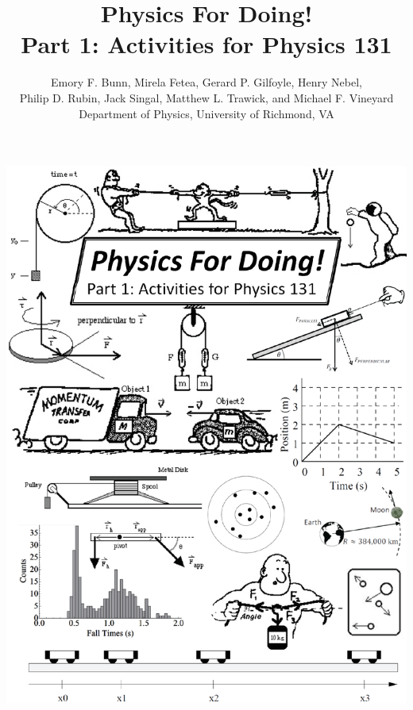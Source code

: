 \thispagestyle{empty}

\begin{center}
\includegraphics[width=7.3in,trim={0 0 .1cm 0},clip]{131_front_pages/131_front_cover.eps}
\end{center}
\newpage

\restoregeometry
\restorepagecolor

\title{Physics For Doing!\\
Part 1: Activities for Physics 131}

\author{Emory F. Bunn, Mirela Fetea, Gerard P. Gilfoyle, Henry Nebel, \\
Philip D. Rubin, Jack Singal, Matthew L. Trawick, and Michael F. Vineyard\\[4pt]
Department of Physics, University of Richmond, VA \\[4pt]
}


